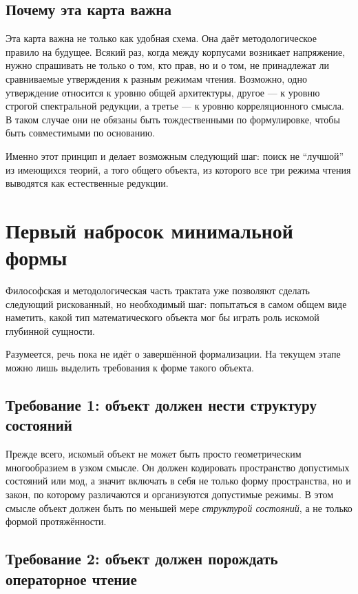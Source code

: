 \documentclass[12pt,a4paper]{article}
\begin{document}
\subsection{Почему эта карта важна}

Эта карта важна не только как удобная схема. Она даёт методологическое правило на будущее. Всякий раз, когда между корпусами возникает напряжение, нужно спрашивать не только о том, кто прав, но и о том, не принадлежат ли сравниваемые утверждения к разным режимам чтения. Возможно, одно утверждение относится к уровню общей архитектуры, другое --- к уровню строгой спектральной редукции, а третье --- к уровню корреляционного смысла. В таком случае они не обязаны быть тождественными по формулировке, чтобы быть совместимыми по основанию.

Именно этот принцип и делает возможным следующий шаг: поиск не ``лучшой'' из имеющихся теорий, а того общего объекта, из которого все три режима чтения выводятся как естественные редукции.

\section{Первый набросок минимальной формы}

Философская и методологическая часть трактата уже позволяют сделать следующий рискованный, но необходимый шаг: попытаться в самом общем виде наметить, какой тип математического объекта мог бы играть роль искомой глубинной сущности.

Разумеется, речь пока не идёт о завершённой формализации. На текущем этапе можно лишь выделить требования к форме такого объекта.

\subsection{Требование 1: объект должен нести структуру состояний}

Прежде всего, искомый объект не может быть просто геометрическим многообразием в узком смысле. Он должен кодировать пространство допустимых состояний или мод, а значит включать в себя не только форму пространства, но и закон, по которому различаются и организуются допустимые режимы. В этом смысле объект должен быть по меньшей мере \textit{структурой состояний}, а не только формой протяжённости.

\subsection{Требование 2: объект должен порождать операторное чтение}
\end{document}
